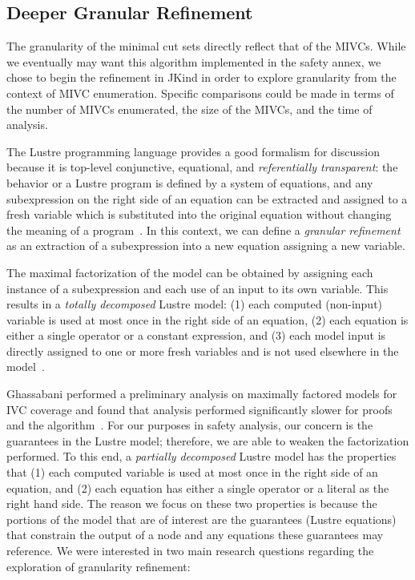 \subsection{Deeper Granular Refinement}
\label{sec:granularityFRESHAlg}
The granularity of the minimal cut sets directly reflect that of the MIVCs. While we eventually may want this algorithm implemented in the safety annex, we chose to begin the refinement in JKind in order to explore granularity from the context of MIVC enumeration. Specific comparisons could be made in terms of the number of MIVCs enumerated, the size of the MIVCs, and the time of analysis. 

The Lustre programming language provides a good formalism for discussion because it is top-level conjunctive, equational, and \emph{referentially transparent}: the behavior or a Lustre program is defined by a system of equations, and any subexpression on the right side of an equation can be extracted and assigned to a fresh variable which is substituted into the original equation without changing the meaning of a program~\cite{Halbwachs91:IEEE,ghassabani_2018}. In this context, we can define a \emph{granular refinement} as an extraction of a subexpression into a new equation assigning a new variable. 

The maximal factorization of the model can be obtained by assigning each instance of a subexpression and each use of an input to its own variable. This results in a \emph{totally decomposed} Lustre model: (1) each computed (non-input) variable is used at most once in the right side of an equation, (2) each equation is either a single operator or a constant expression, and (3) each model input is directly assigned to one or more fresh variables and is not used elsewhere in the model~\cite{ghassabani_2018}.

Ghassabani performed a preliminary analysis on maximally factored models for IVC coverage and found that analysis performed significantly slower for proofs and the \ivcmust algorithm~\cite{ghassabani_2018}. For our purposes in safety analysis, our concern is the guarantees in the Lustre model; therefore, we are able to weaken the factorization performed. To this end, a \emph{partially decomposed} Lustre model has the properties that (1) each computed variable is used at most once in the right side of an equation, and (2) each equation has either a single operator or a literal as the right hand side. The reason we focus on these two properties is because the portions of the model that are of interest are the guarantees (Lustre equations) that constrain the output of a node and any equations these guarantees may reference. We were interested in two main research questions regarding the exploration of granularity refinement: 

